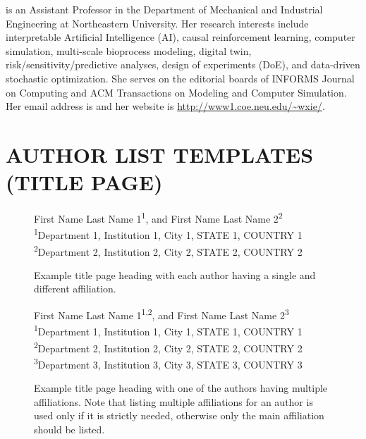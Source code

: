 \documentclass{wscpaperproc}
\theoremstyle{wsc}
\begin{document}
 is an Assistant Professor in the Department of Mechanical and Industrial Engineering at Northeastern University. Her research interests include interpretable Artificial Intelligence (AI), causal reinforcement learning, computer simulation, multi-scale bioprocess modeling, digital twin, risk/sensitivity/predictive analyses, design of experiments (DoE), and data-driven stochastic optimization. She serves on the editorial boards of INFORMS Journal on Computing and ACM Transactions on Modeling and Computer Simulation. Her email address is  and her website is \url{http://www1.coe.neu.edu/~wxie/}. \\


\newpage

\section*{AUTHOR LIST TEMPLATES (TITLE PAGE)}

\vspace{11pt}

\begin{figure}[!htb]
\begin{center}
		First Name Last Name 1\textsuperscript{1}, and First Name Last Name 2\textsuperscript{2}\\[11pt]		
		\textsuperscript{1}Department 1, Institution 1, City 1, STATE 1, COUNTRY 1\\
		\textsuperscript{2}Department 2, Institution 2, City 2, STATE 2, COUNTRY 2
        \end{center}
        \caption{Example title page heading with each author having a single and different affiliation.}  \label{fig:different}
\end{figure}

\vspace{22pt}

\begin{figure}[!htb]
\begin{center}
		First Name Last Name 1\textsuperscript{1,2}, and First Name Last Name 2\textsuperscript{3}\\[11pt]
		\textsuperscript{1}Department 1, Institution 1, City 1, STATE 1, COUNTRY 1\\
		\textsuperscript{2}Department 2, Institution 2, City 2, STATE 2, COUNTRY 2\\
        \textsuperscript{3}Department 3, Institution 3, City 3, STATE 3, COUNTRY 3 
        \end{center}
        \caption{Example title page heading with one of the authors having multiple affiliations. Note that listing multiple affiliations for an author is used only if it is strictly needed, otherwise only the main affiliation should be listed.} \label{fig:multiple}
\end{figure}
\end{document}
